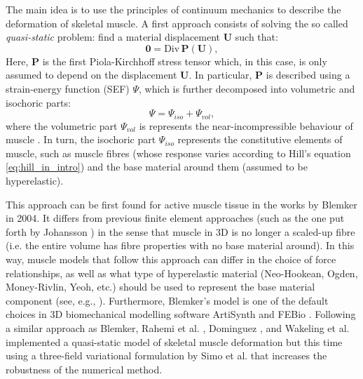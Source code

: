 \documentclass{sfuthesis}
\numberwithin{equation}{section}
\numberwithin{figure}{chapter}
\numberwithin{table}{chapter}
\theoremstyle{definition}
\def\*#1{{\mathbf{#1}}} %
\newcommand{\Divt}[1]{{\bm{\mathrm{Div}} \, #1}}
\begin{document}
The main idea is to use the principles of continuum mechanics to describe the deformation of skeletal muscle. A first approach consists of solving the so called \textit{quasi-static} problem: find a material displacement $\*U$ such that:
\begin{equation} \label{eq:intro_quasistatic_problem}
    \*0 = \Divt{\*P(\*U)},
\end{equation}
Here, $\*P$ is the first Piola-Kirchhoff stress tensor which, in this case, is only assumed to depend on the displacement $\*U$. In particular, $\*P$ is described using a strain-energy function (SEF) $\Psi$, which is further decomposed into volumetric and isochoric parts:
\begin{equation}
    \Psi = \Psi_{iso} + \Psi_{vol},
\end{equation}
where the volumetric part $\Psi_{vol}$ is represents the near-incompressible behaviour of muscle \cite{BaskinPaolini}. In turn, the isochoric part $\Psi_{iso}$ represents the constitutive elements of muscle, such as muscle fibres (whose response varies according to Hill's equation \eqref{eq:hill_in_intro}) and the base material around them (assumed to be hyperelastic). 

This approach can be first found for active muscle tissue in the works by Blemker \cite{BlemkerThesis,BlemkerDelp2005,BlemkerPinskyDelp2005} in 2004. It differs from previous finite element approaches (such as the one put forth by Johansson \cite{Johansson2000}) in the sense that muscle in 3D is no longer a scaled-up fibre (i.e. the entire volume has fibre properties with no base material around). In this way, muscle models that follow this approach can differ in the choice of force relationships, as well as what type of hyperelastic material (Neo-Hookean, Ogden, Money-Rivlin, Yeoh, etc.) should be used to represent the base material component (see, e.g., \cite{HeidlaufRohrle2013,Tang2007}). Furthermore, Blemker's model is one of the default choices in 3D biomechanical modelling software ArtiSynth \cite{Artisynth} and FEBio \cite{FEBio}. Following a similar approach as Blemker, Rahemi et al. \cite{RahemiNigamWakeling2014,RahemiNigamWakeling2015}, Dominguez \cite{Seba}, and Wakeling et al. \cite{Paper1_WakelingEtAl2020} implemented a quasi-static model of skeletal muscle deformation but this time using a three-field variational formulation by Simo et al. \cite{SimoTaylorPister1985} that increases the robustness of the numerical method.
\end{document}
